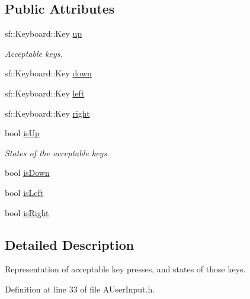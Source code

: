 \subsection*{Public Attributes}
\begin{DoxyCompactItemize}
\item 
sf\-::\-Keyboard\-::\-Key \hyperlink{structAUserInput_1_1SKeyStates_a738215f9ee9440c8f11aa0a10fa83d42}{up}
\begin{DoxyCompactList}\small\item\em Acceptable keys. \end{DoxyCompactList}\item 
sf\-::\-Keyboard\-::\-Key \hyperlink{structAUserInput_1_1SKeyStates_a95d21217e452090bd28017c8b1110e5d}{down}
\item 
sf\-::\-Keyboard\-::\-Key \hyperlink{structAUserInput_1_1SKeyStates_aea4dc08983d8f716718a3792c779ff5c}{left}
\item 
sf\-::\-Keyboard\-::\-Key \hyperlink{structAUserInput_1_1SKeyStates_aa9551aac4a89e8c78e20d4a12a8afcee}{right}
\item 
bool \hyperlink{structAUserInput_1_1SKeyStates_ab227ece210dcf94947d71b21b6ea906e}{is\-Up}
\begin{DoxyCompactList}\small\item\em States of the acceptable keys. \end{DoxyCompactList}\item 
bool \hyperlink{structAUserInput_1_1SKeyStates_af06f59dc7cb752237f23e6aceac4453e}{is\-Down}
\item 
bool \hyperlink{structAUserInput_1_1SKeyStates_ab29367ed4bde7e4dd9884d75f300e5ec}{is\-Left}
\item 
bool \hyperlink{structAUserInput_1_1SKeyStates_afcf8a092b05f9ce67f4b2c5ea73a1f40}{is\-Right}
\end{DoxyCompactItemize}


\subsection{Detailed Description}
Representation of acceptable key presses, and states of those keys. 

Definition at line 33 of file A\-User\-Input.\-h.



